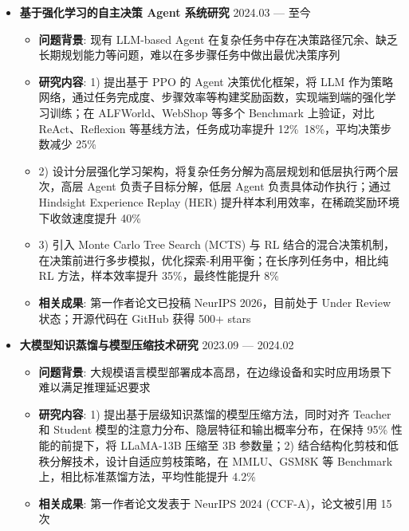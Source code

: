 \documentclass[zh]{resume}
\begin{document}
\begin{itemize}
    \item \textbf{基于强化学习的自主决策 Agent 系统研究} \hfill 2024.03 --- 至今
    \begin{itemize}
        \item \textbf{问题背景}: 现有 LLM-based Agent 在复杂任务中存在决策路径冗余、缺乏长期规划能力等问题，难以在多步骤任务中做出最优决策序列
        \item \textbf{研究内容}: 1) 提出基于 PPO 的 Agent 决策优化框架，将 LLM 作为策略网络，通过任务完成度、步骤效率等构建奖励函数，实现端到端的强化学习训练；在 ALFWorld、WebShop 等多个 Benchmark 上验证，对比 ReAct、Reflexion 等基线方法，任务成功率提升 12\%~18\%，平均决策步数减少 25\%
        \item 2) 设计分层强化学习架构，将复杂任务分解为高层规划和低层执行两个层次，高层 Agent 负责子目标分解，低层 Agent 负责具体动作执行；通过 Hindsight Experience Replay (HER) 提升样本利用效率，在稀疏奖励环境下收敛速度提升 40\%
        \item 3) 引入 Monte Carlo Tree Search (MCTS) 与 RL 结合的混合决策机制，在决策前进行多步模拟，优化探索-利用平衡；在长序列任务中，相比纯 RL 方法，样本效率提升 35\%，最终性能提升 8\%
        \item \textbf{相关成果}: 第一作者论文已投稿 NeurIPS 2026，目前处于 Under Review 状态；开源代码在 GitHub 获得 500+ stars
    \end{itemize}

    \item \textbf{大模型知识蒸馏与模型压缩技术研究} \hfill 2023.09 --- 2024.02
    \begin{itemize}
        \item \textbf{问题背景}: 大规模语言模型部署成本高昂，在边缘设备和实时应用场景下难以满足推理延迟要求
        \item \textbf{研究内容}: 1) 提出基于层级知识蒸馏的模型压缩方法，同时对齐 Teacher 和 Student 模型的注意力分布、隐层特征和输出概率分布，在保持 95\% 性能的前提下，将 LLaMA-13B 压缩至 3B 参数量；2) 结合结构化剪枝和低秩分解技术，设计自适应剪枝策略，在 MMLU、GSM8K 等 Benchmark 上，相比标准蒸馏方法，平均性能提升 4.2\%
        \item \textbf{相关成果}: 第一作者论文发表于 NeurIPS 2024 (CCF-A)，论文被引用 15 次
    \end{itemize}
\end{itemize}
\end{document}
